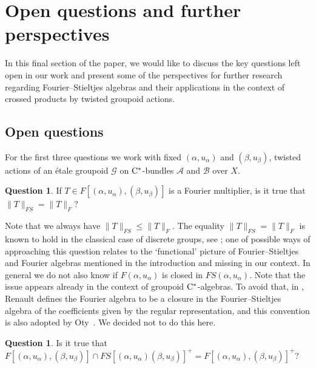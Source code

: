 \documentclass[11 pt, leqno]{amsart}
\numberwithin{equation}{section}
\theoremstyle{plain}
\theoremstyle{definition}
\newtheorem {quest} [thm]{Question}
\newcommand{\B}{\mathcal B}
\newcommand{\G}{\mathcal G} %
\newcommand{\A}{\mathcal A}
\newcommand{\cst}{\ifmmode\mathrm{C}^*\else{$\mathrm{C}^*$}\fi}
\begin{document}
%
%
\section{Open questions and further perspectives}
\label{Sec:QuestionsPerspectives}

In this final section of the paper, we would like to discuss the key questions left open in our work and present some of the perspectives for further research regarding Fourier--Stieltjes algebras and their applications in the context of crossed products by twisted groupoid actions. 

%
\subsection*{Open questions}
For the first three questions we work with fixed $(\alpha,u_\alpha)$ and $(\beta, u_\beta)$, twisted actions of an \'etale groupoid $\G$ on $\cst$-bundles $\A$ and $\B$ over $X$. 

\begin{quest} \label{quest:norms}
If $T\in F[(\alpha,u_{\alpha}),(\beta,u_{\beta})]$ is a Fourier multiplier, is it true that $\|T\|_{FS} = \|T\|_{F}$? 
\end{quest}

Note that we always have $\|T\|_{FS} \leq \|T\|_{F}$. 
The equality $\|T\|_{FS}=\|T\|_{F}$ is known to hold in the classical case of discrete groups, see \cite{Eymard}; one of possible ways of approaching this question relates to the `functional' picture of Fourier--Stieltjes and Fourier algebras mentioned in the introduction and missing in our context.
In general we do not also know if $F(\alpha,u_{\alpha})$ is closed in $FS(\alpha,u_{\alpha})$. 
Note that the issue appears already in the context of groupoid $\cst$-algebras. 
To avoid that, in \cite[Definition 1.4]{RenaultFourier}, Renault defines the Fourier algebra to be a closure in the Fourier--Stieltjes algebra of the coefficients given by the regular representation, and this convention is also adopted by Oty~\cite{Oty}.
We decided not to do this here.

\begin{quest} \label{quest:positive}
Is it true that $F[(\alpha,u_{\alpha}),(\beta, u_\beta)] \cap FS[(\alpha,u_{\alpha})(\beta, u_\beta)]^+ = F[(\alpha,u_{\alpha}),(\beta, u_\beta)]^+$? 
\end{quest}
\end{document}
